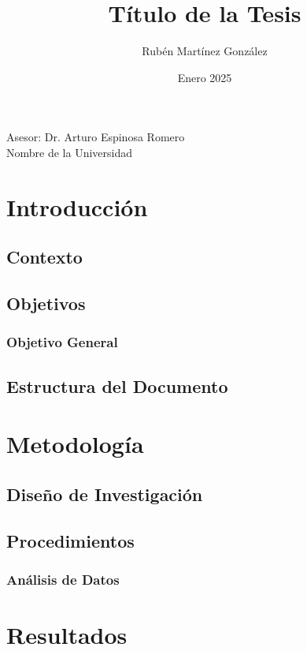 \documentclass[11pt]{article}
\title{Título de la Tesis}
\author{Rubén Martínez González}
\date{Enero 2025}
\newcommand{\university}{Nombre de la Universidad}
\newcommand{\advisor}{Dr. Arturo Espinosa Romero}
\begin{document}
\maketitle
\begin{center}
    Asesor: \advisor \\
    \university
\end{center}
\clearpage

\tableofcontents
\clearpage

\section{Introducción}
\subsection{Contexto}
\subsection{Objetivos}
\subsubsection{Objetivo General}
\subsection{Estructura del Documento}

\section{Metodología}
\subsection{Diseño de Investigación}
\subsection{Procedimientos}
\subsubsection{Análisis de Datos}

\section{Resultados}



\end{document}
